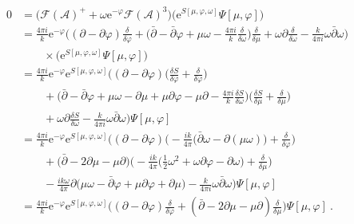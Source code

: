\documentclass[12pt,a4paper]{article}
\begin{document}
\begin{align} 
    0&=\big(\mathcal{F}(\mathcal{A})^++\omega \mathrm{e}^{-\varphi} \mathcal{F}(\mathcal{A})^3\big) \big(\mathrm{e}^{S[\mu,\varphi,\omega]} \Psi[\mu,\varphi]\big)  \nonumber \\
    &=\frac{4\pi i}{k} \mathrm{e}^{-\varphi} \bigg((\partial-\partial \varphi) \frac{\delta}{\delta \varphi}+\bigg(\bar{\partial}-\bar{\partial} \varphi+\mu \omega-\frac{4\pi i}{k} \frac{\delta}{\delta \omega}\bigg) \frac{\delta}{\delta \mu} +\omega \partial \frac{\delta}{\delta \omega}-\frac{k}{4\pi i} \omega \bar{\partial} \omega \bigg) \nonumber\\
    &\qquad\times \big(\mathrm{e}^{S[\mu,\varphi,\omega]} \Psi[\mu,\varphi]\big)  \nonumber \\
    &=\frac{4\pi i}{k} \mathrm{e}^{-\varphi} \mathrm{e}^{S[\mu,\varphi,\omega]}\bigg((\partial-\partial \varphi) \bigg(\frac{\delta S}{\delta \varphi}+\frac{\delta}{\delta \varphi}\bigg)\nonumber\\
    &\qquad+\bigg(\bar{\partial}-\bar{\partial} \varphi+\mu \omega-\partial \mu+\mu \partial \varphi-\mu \partial-\frac{4\pi i}{k} \frac{\delta S}{\delta \omega}\bigg) \bigg(\frac{\delta S}{\delta \mu}+\frac{\delta}{\delta \mu}\bigg) \nonumber\\
    &\qquad+\omega \partial \frac{\delta S}{\delta \omega}-\frac{k}{4\pi i} \omega \bar{\partial} \omega \bigg) \Psi[\mu,\varphi]  \nonumber \\
    &=\frac{4\pi i}{k} \mathrm{e}^{-\varphi} \mathrm{e}^{S[\mu,\varphi,\omega]}\bigg((\partial-\partial \varphi) \bigg(-\frac{i k}{4\pi} \big(\bar{\partial} \omega-\partial(\mu \omega)\big)+\frac{\delta}{\delta \varphi}\bigg)\nonumber\\
    &\qquad+\big(\bar{\partial}-2 \partial \mu-\mu \partial \big) \bigg(-\frac{i k}{4\pi} \bigg(\frac{1}{2} \omega^2+\omega \partial \varphi-\partial \omega \bigg)+\frac{\delta}{\delta \mu}\bigg) \nonumber\\
    &\qquad-\frac{i k \omega}{4\pi} \partial \big( \mu \omega-\bar{\partial}\varphi+\mu \partial \varphi+\partial \mu \big) -\frac{k}{4\pi i} \omega \bar{\partial} \omega \bigg) \Psi[\mu,\varphi]  \nonumber \\
    &=\frac{4\pi i}{k} \mathrm{e}^{-\varphi} \mathrm{e}^{S[\mu,\varphi,\omega]}\bigg( (\partial -\partial \varphi) \frac{\delta}{\delta \varphi}+(\bar{\partial}-2 \partial \mu-\mu \partial) \frac{\delta}{\delta \mu} \bigg) \Psi[\mu,\varphi]~. \label{eq:F+ constraint after first reduction}
\end{align}
\end{document}
